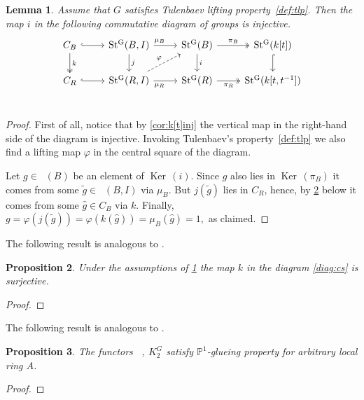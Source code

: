 \documentclass[oneside,12pt]{amsart}
\numberwithin{equation}{section}
\newtheorem{lem}{Lemma}
\numberwithin{lem}{section}
\newtheorem{prop}[lem]{Proposition}
\theoremstyle{definition}
\theoremstyle{remark}
\DeclareMathOperator{\St}{St^G}
\DeclareMathOperator{\Bigker}{Ker\,}
\newcommand{\Pro}{\mathbb{P}}
\begin{document}
\begin{lem} \label{lem:tulinj} Assume that $G$ satisfies Tulenbaev lifting property~\ref{def:tlp}. 
Then the map $i$ in the following commutative diagram of groups is injective.
\begin{equation} \label{diag:cs} \begin{tikzcd} 
C_{B} \ar[r, hookrightarrow] \ar[d, "k", twoheadrightarrow] & \St(B, I) \ar[r, "\mu_B" near start] \ar[d, "j"] & \ar[d, "i"] \St(B) \ar[r, "\pi_B", twoheadrightarrow] & \St(k[t]) \ar[d, hookrightarrow] \\     
C_{R} \ar[r, hookrightarrow]                                & \St(R, I) \ar[ur, dashrightarrow, "\varphi"] \ar[r, "\mu_R"' near start] & \St(R) \ar[r, "\pi_R"', twoheadrightarrow] & \St(k[t, t^{-1}]) \\ \end{tikzcd} \end{equation} \end{lem}
\begin{proof} First of all, notice that by \cref{cor:k[t]inj} the vertical map in the right-hand side of the diagram is injective.
 Invoking Tulenbaev's property~\ref{def:tlp} we also find a lifting map $\varphi$ in the central square of the diagram.

 Let $g \in \St(B)$ be an element of $\Bigker(i)$.
 Since $g$ also lies in $\Bigker(\pi_B)$ it comes from some $\widetilde{g} \in \St(B, I)$ via $\mu_B$.
 But $j(\widetilde{g})$ lies in $C_R$, hence, by \cref{prop:kersurj} below it comes from some $\widehat{g} \in C_B$ via $k$.
 Finally, $g = \varphi(j(\widetilde{g})) = \varphi(k(\widehat{g})) = \mu_B(\widehat{g}) = 1,$ as claimed. \end{proof}

The following result is analogous to \cite[Proposition~4.1]{Tu}.
\begin{prop} \label{prop:kersurj} Under the assumptions of \cref{lem:tulinj} the map $k$ in the diagram \eqref{diag:cs} is surjective. \end{prop}
\begin{proof}
\end{proof}

The following result is analogous to \cite[Proposition~4.3]{Tu}.
\begin{prop} \label{prop:p1g} The functors $\St$, $K_2^G$ satisfy $\Pro^1$-glueing property for arbitrary local ring $A$.
\end{prop}
\begin{proof}
\end{proof}
\end{document}
